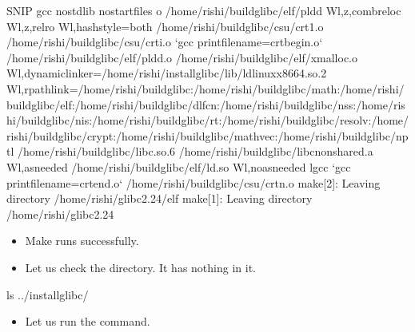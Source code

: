\documentclass[letterpaper,10pt,english]{sphinxmanual}
\begin{document}
\begin{sphinxVerbatim}[commandchars=\\\{\}]
      \PYGZgt{}\PYGZgt{}\PYGZgt{}\PYGZgt{}\PYGZgt{}\PYGZgt{}\PYGZgt{}\PYGZgt{}\PYGZgt{}\PYGZgt{}\PYGZgt{}\PYGZgt{}\PYGZgt{}\PYGZgt{}\PYGZgt{}\PYGZgt{}\PYGZgt{}\PYGZgt{}\PYGZgt{}\PYGZgt{}\PYGZgt{}SNIP\PYGZlt{}\PYGZlt{}\PYGZlt{}\PYGZlt{}\PYGZlt{}\PYGZlt{}\PYGZlt{}\PYGZlt{}\PYGZlt{}\PYGZlt{}\PYGZlt{}\PYGZlt{}\PYGZlt{}\PYGZlt{}\PYGZlt{}\PYGZlt{}\PYGZlt{}\PYGZlt{}\PYGZlt{}
gcc \PYGZhy{}nostdlib \PYGZhy{}nostartfiles \PYGZhy{}o /home/rishi/build\PYGZus{}glibc/elf/pldd    \PYGZhy{}Wl,\PYGZhy{}z,combreloc \PYGZhy{}Wl,\PYGZhy{}z,relro \PYGZhy{}Wl,\PYGZhy{}\PYGZhy{}hash\PYGZhy{}style=both /home/rishi/build\PYGZus{}glibc/csu/crt1.o /home/rishi/build\PYGZus{}glibc/csu/crti.o {}`gcc  \PYGZhy{}\PYGZhy{}print\PYGZhy{}file\PYGZhy{}name=crtbegin.o{}` /home/rishi/build\PYGZus{}glibc/elf/pldd.o /home/rishi/build\PYGZus{}glibc/elf/xmalloc.o  \PYGZhy{}Wl,\PYGZhy{}dynamic\PYGZhy{}linker=/home/rishi/install\PYGZus{}glibc/lib/ld\PYGZhy{}linux\PYGZhy{}x86\PYGZhy{}64.so.2 \PYGZhy{}Wl,\PYGZhy{}rpath\PYGZhy{}link=/home/rishi/build\PYGZus{}glibc:/home/rishi/build\PYGZus{}glibc/math:/home/rishi/build\PYGZus{}glibc/elf:/home/rishi/build\PYGZus{}glibc/dlfcn:/home/rishi/build\PYGZus{}glibc/nss:/home/rishi/build\PYGZus{}glibc/nis:/home/rishi/build\PYGZus{}glibc/rt:/home/rishi/build\PYGZus{}glibc/resolv:/home/rishi/build\PYGZus{}glibc/crypt:/home/rishi/build\PYGZus{}glibc/mathvec:/home/rishi/build\PYGZus{}glibc/nptl /home/rishi/build\PYGZus{}glibc/libc.so.6 /home/rishi/build\PYGZus{}glibc/libc\PYGZus{}nonshared.a \PYGZhy{}Wl,\PYGZhy{}\PYGZhy{}as\PYGZhy{}needed /home/rishi/build\PYGZus{}glibc/elf/ld.so \PYGZhy{}Wl,\PYGZhy{}\PYGZhy{}no\PYGZhy{}as\PYGZhy{}needed \PYGZhy{}lgcc  {}`gcc  \PYGZhy{}\PYGZhy{}print\PYGZhy{}file\PYGZhy{}name=crtend.o{}` /home/rishi/build\PYGZus{}glibc/csu/crtn.o
make[2]: Leaving directory \PYGZsq{}/home/rishi/glibc\PYGZhy{}2.24/elf\PYGZsq{}
make[1]: Leaving directory \PYGZsq{}/home/rishi/glibc\PYGZhy{}2.24\PYGZsq{}
\end{sphinxVerbatim}
\begin{itemize}
\item {} 
Make runs successfully.

\item {} 
Let us check the  directory. It has nothing in it.

\end{itemize}

\begin{sphinxVerbatim}[commandchars=\\\{\}]
\PYGZdl{} ls ../install\PYGZus{}glibc/
\end{sphinxVerbatim}
\begin{itemize}
\item {} 
Let us run the  command.

\end{itemize}
\end{document}

